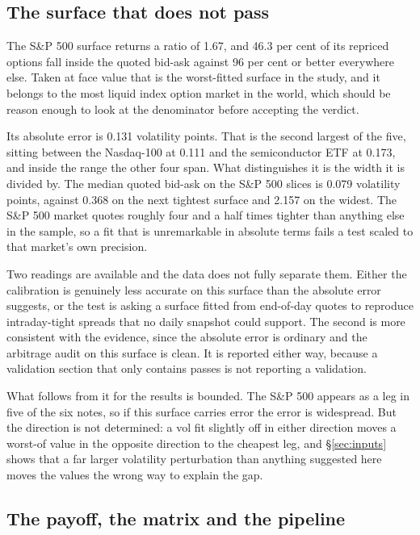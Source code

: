 \subsection{The surface that does not pass}

The S\&P 500 surface returns a ratio of 1.67, and 46.3 per cent of its repriced
options fall inside the quoted bid-ask against 96 per cent or better everywhere
else. Taken at face value that is the worst-fitted surface in the study, and it
belongs to the most liquid index option market in the world, which should be
reason enough to look at the denominator before accepting the verdict.

Its absolute error is 0.131 volatility points. That is the second largest of
the five, sitting between the Nasdaq-100 at 0.111 and the semiconductor ETF at
0.173, and inside the range the other four span. What distinguishes it is the
width it is divided by. The median quoted bid-ask on the S\&P 500 slices is
0.079 volatility points, against 0.368 on the next tightest surface and 2.157
on the widest. The S\&P 500 market quotes roughly four and a half times tighter
than anything else in the sample, so a fit that is unremarkable in absolute
terms fails a test scaled to that market's own precision.

Two readings are available and the data does not fully separate them. Either
the calibration is genuinely less accurate on this surface than the absolute
error suggests, or the test is asking a surface fitted from end-of-day quotes
to reproduce intraday-tight spreads that no daily snapshot could support. The
second is more consistent with the evidence, since the absolute error is
ordinary and the arbitrage audit on this surface is clean. It is reported
either way, because a validation section that only contains passes is not
reporting a validation.

What follows from it for the results is bounded. The S\&P 500 appears as a leg
in five of the six notes, so if this surface carries error the error is
widespread. But the direction is not determined: a vol fit slightly off in
either direction moves a worst-of value in the opposite direction to the
cheapest leg, and \S\ref{sec:inputs} shows that a far larger volatility
perturbation than anything suggested here moves the values the wrong way to
explain the gap.

\subsection{The payoff, the matrix and the pipeline}

